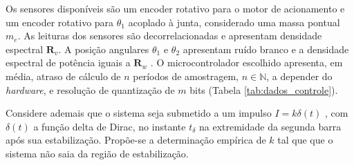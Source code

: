 \documentclass[a4paper, twoside]{article}
\begin{document}
    Os sensores disponíveis são um encoder rotativo para o motor de acionamento e um encoder rotativo para $\theta_1$ acoplado à junta, considerado uma massa pontual $m_e$. As leituras dos sensores são decorrelacionadas e apresentam densidade espectral $\mathbf{R}_v$. A posição angulares $\theta_1$ e $\theta_2$ apresentam ruído branco e a densidade espectral de potência iguais a $\mathbf{R}_w$ \cite{controle_digital_2018}. O microcontrolador escolhido apresenta, em média, atraso de cálculo de $n$ períodos de amostragem, $n \in \mathbb{N}$, a depender do \emph{hardware}, e resolução de quantização de $m$ bits (Tabela \ref{tab:dados_controle}).
    
    Considere ademais que o sistema seja submetido a um impulso $I = k \delta(t)$ \cite{Beer:2003:VME:1207649}, com $\delta(t)$ a função delta de Dirac, no instante $t_{\delta}$ na extremidade da segunda barra após sua estabilização. Propõe-se a determinação empírica de $k$ tal que que o sistema não saia da região de estabilização. 
\end{document}

